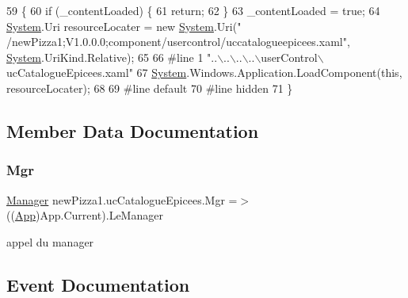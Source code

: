 \begin{DoxyCode}
59                                           \{
60             \textcolor{keywordflow}{if} (\_contentLoaded) \{
61                 \textcolor{keywordflow}{return};
62             \}
63             \_contentLoaded = \textcolor{keyword}{true};
64             \hyperlink{namespaceSystem}{System}.Uri resourceLocater = \textcolor{keyword}{new} \hyperlink{namespaceSystem}{System}.Uri(\textcolor{stringliteral}{"
      /newPizza1;V1.0.0.0;component/usercontrol/uccatalogueepicees.xaml"}, \hyperlink{namespaceSystem}{System}.UriKind.Relative);
65             
66 \textcolor{preprocessor}{            #line 1 "..\(\backslash\)..\(\backslash\)..\(\backslash\)..\(\backslash\)userControl\(\backslash\)ucCatalogueEpicees.xaml"
}
67             \hyperlink{namespaceSystem}{System}.Windows.Application.LoadComponent(\textcolor{keyword}{this}, resourceLocater);
68             
69 \textcolor{preprocessor}{            #line default
}
70 \textcolor{preprocessor}{            #line hidden
}
71         \}
\end{DoxyCode}


\subsection{Member Data Documentation}
\mbox{\label{classnewPizza1_1_1ucCatalogueEpicees_a30d96d36cd2657aa9b7315194c3c2f98}} 
\subsubsection{\texorpdfstring{Mgr}{Mgr}}
{\footnotesize\ttfamily \hyperlink{classModele_1_1Manager}{Manager} new\+Pizza1.\+uc\+Catalogue\+Epicees.\+Mgr =$>$ ((\hyperlink{classnewPizza1_1_1App}{App})App.\+Current).Le\+Manager}



appel du manager 



\subsection{Event Documentation}
\mbox{\label{classnewPizza1_1_1ucCatalogueEpicees_a289e3a4cecfede80cbe8d581e11219c6}} 
